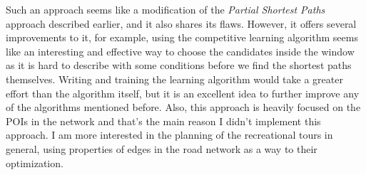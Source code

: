 \documentclass{ctuthesis}
\begin{document}
Such an approach seems like a modification of the \textit{Partial Shortest Paths} approach described earlier, and it also shares its flaws. However, it offers several improvements to it, for example, using the competitive learning algorithm seems like an interesting and effective way to choose the candidates inside the window as it is hard to describe with some conditions before we find the shortest paths themselves. Writing and training the learning algorithm would take a greater effort than the algorithm itself, but it is an excellent idea to further improve any of the algorithms mentioned before. Also, this approach is heavily focused on the POIs in the network and that's the main reason I didn't implement this approach. I am more interested in the planning of the recreational tours in general, using properties of edges in the road network as a way to their optimization.
\end{document}
